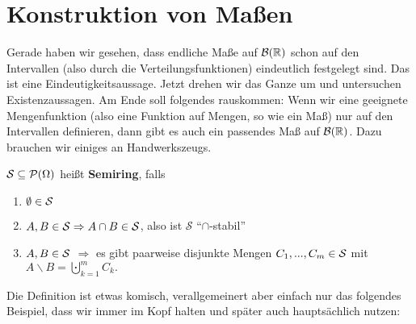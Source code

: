 \section{Konstruktion von Maßen}
Gerade haben wir gesehen, dass endliche Ma\ss e auf $\mathcal B(\mathbb{R})$ schon auf den Intervallen (also durch die Verteilungsfunktionen) eindeutlich festgelegt sind. Das ist eine Eindeutigkeitsaussage. Jetzt drehen wir das Ganze um und untersuchen Existenzaussagen. Am Ende soll folgendes rauskommen: Wenn wir eine  geeignete Mengenfunktion (also eine Funktion auf Mengen, so wie ein Ma\ss) nur auf den Intervallen definieren, dann gibt es auch ein passendes Ma\ss{} auf $\mathcal B(\mathbb{R})$. Dazu brauchen wir einiges an Handwerkszeugs.
\begin{deff}
	$\mathcal{S} \subseteq \mathcal{P}(\Omega)$ heißt \textbf{Semiring}, falls
	\begin{enumerate}[label=(\roman*)]
		\item $\emptyset \in \mathcal{S}$
		\item $A,B \in \mathcal{S} \Rightarrow A\cap B \in \mathcal{S}$, also ist $\mathcal S$ \enquote{$\cap$-stabil}
		\item \label{semiring drittens} $A,B \in \mathcal{S}$ $\Rightarrow$ es gibt paarweise disjunkte Mengen $C_1,...,C_m \in \mathcal{S}$ mit $A \backslash B = \bigcupdot\limits_{k=1}^{m} C_k.$
	\end{enumerate}
\end{deff}
Die Definition ist etwas komisch, verallgemeinert aber einfach nur das folgendes Beispiel, dass wir immer im Kopf halten und sp\"ater auch haupts\"achlich nutzen:
